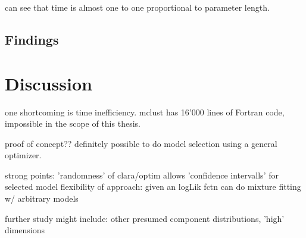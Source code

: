 can see that time is almost one to one proportional to parameter length.

\section{Findings}


\chapter{Discussion}

one shortcoming is time inefficiency. 
mclust has 16'000 lines of Fortran code, impossible in the scope of this thesis.

proof of concept??
definitely possible to do model selection using a general optimizer.

strong points:
'randomness' of clara/optim allows 'confidence intervalls' for selected model
flexibility of approach: given an logLik fctn can do mixture fitting w/ arbitrary
models

further study might include: other presumed component distributions, 'high' dimensions

